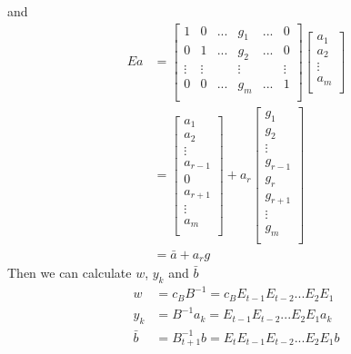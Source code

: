                 and
                \begin{align}
                    Ea &=  \left[ \begin{array}{cccccc}
                    1 & 0 & ... & g_1 & ... & 0 \\
                    0 & 1 & ... & g_2 & ... & 0 \\
                    \vdots & \vdots & & \vdots & & \vdots \\
                    0 & 0 & ... & g_m & ... & 1 \\
                    \end{array} \right]
                     \left[ \begin{array}{c}
                    a_1 \\
                    a_2 \\
                    \vdots \\
                    a_m \\
                    \end{array} \right] \nonumber \\
                    &= 
                    \left[ \begin{array}{c}
                    a_1 \\
                    a_2 \\
                    \vdots \\
                    a_{r-1} \\
                    0 \\
                    a_{r+1} \\
                    \vdots \\
                    a_m \\
                    \end{array} \right] +
                    a_r\left[ \begin{array}{c}
                    g_1 \\
                    g_2 \\
                    \vdots \\
                    g_{r-1} \\
                    g_r \\
                    g_{r+1} \\
                    \vdots \\
                    g_m \\
                    \end{array} \right] \nonumber \\
                    &=\bar{a}+a_rg \nonumber
                \end{align}
                Then we can calculate $w$, $y_k$ and $\bar{b}$
                \begin{align}
                    w&=c_BB^{-1} = c_BE_{t-1}E_{t-2}...E_2E_1 \nonumber \\
                    y_k &=B^{-1}a_k = E_{t-1}E_{t-2}...E_2E_1a_k \nonumber \\
                    \bar{b}&=B^{-1}_{t+1}b=E_tE_{t-1}E_{t-2}...E_2E_1b \nonumber
                \end{align}

